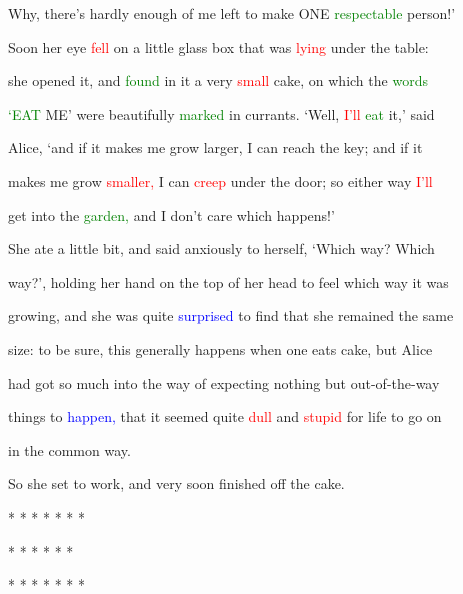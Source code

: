  Why, there’s hardly enough of me left to make ONE \textcolor{green}{respectable} person!’



 Soon her eye \textcolor{red}{fell} on a little glass box that was \textcolor{red}{lying} under the table:

 she opened it, and \textcolor{green}{found} in it a very \textcolor{red}{small} cake, on which the \textcolor{green}{words}

 \textcolor{green}{‘EAT} ME’ were beautifully \textcolor{green}{marked} in currants. ‘Well, \textcolor{red}{I’ll} \textcolor{green}{eat} it,’ said

 Alice, ‘and if it makes me \textcolor{BurntOrange}{grow} larger, I can reach the key; and if it

 makes me \textcolor{BurntOrange}{grow} \textcolor{red}{smaller,} I can \textcolor{red}{creep} under the door; so either way \textcolor{red}{I’ll}

 get into the \textcolor{green}{garden,} and I don’t care which happens!’



 She ate a little bit, and said anxiously to herself, ‘Which way? Which

 way?’, holding her hand on the \textcolor{BurntOrange}{top} of her head to feel which way it was

 \textcolor{BurntOrange}{growing,} and she was quite \textcolor{blue}{surprised} to find that she remained the same

 size: to be sure, this generally happens when one eats cake, but Alice

 had got so much into the way of \textcolor{BurntOrange}{expecting} nothing but out-of-the-way

 things to \textcolor{blue}{happen,} that it seemed quite \textcolor{red}{dull} and \textcolor{red}{stupid} for life to go on

 in the common way.



 So she set to work, and very soon finished off the cake.



 * * * * * * *



 * * * * * *



 * * * * * * *









